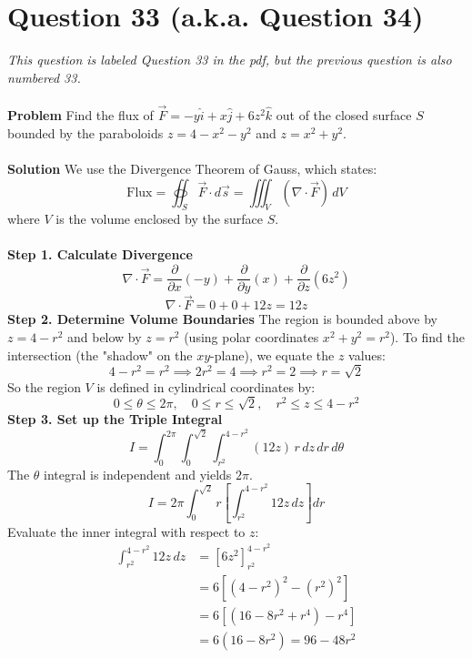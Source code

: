 \documentclass{article}
\begin{document}
\pagebreak


\section{Question 33 (a.k.a. Question 34)}
\textit{\small{This question is labeled Question 33 in the pdf, but the previous
		question is also numbered 33.}}
\\
\\
\textbf{Problem}
Find the flux of $\vec{F} = -y\hat{i} + x\hat{j} + 6z^2\hat{k}$ out of the
closed surface $S$ bounded by the paraboloids $z = 4 - x^2 - y^2$ and
$z = x^2 + y^2$.
\\
\\
\textbf{Solution}
We use the Divergence Theorem of Gauss, which states:
\[
	\text{Flux} = \oiint_S \vec{F} \cdot d\vec{s} = \iiint_V (\nabla \cdot \vec{F}) \, dV
\]
where $V$ is the volume enclosed by the surface $S$.
\\
\\
\textbf{Step 1. Calculate Divergence}
\[
	\nabla \cdot \vec{F} = \frac{\partial}{\partial x}(-y) + \frac{\partial}{\partial y}(x) + \frac{\partial}{\partial z}(6z^2)
\]
\[
	\nabla \cdot \vec{F} = 0 + 0 + 12z = 12z
\]
\textbf{Step 2. Determine Volume Boundaries}
The region is bounded above by $z = 4 - r^2$ and below by $z = r^2$ (using polar
coordinates $x^2+y^2=r^2$). To find the intersection (the "shadow" on the
$xy$-plane), we equate the $z$ values:
\[
	4 - r^2 = r^2 \implies 2r^2 = 4 \implies r^2 = 2 \implies r = \sqrt{2}
\]
So the region $V$ is defined in cylindrical coordinates by:
\[
	0 \le \theta \le 2\pi, \quad 0 \le r \le \sqrt{2}, \quad r^2 \le z \le 4 - r^2
\]
\textbf{Step 3. Set up the Triple Integral}
\[
	I = \int_0^{2\pi} \int_0^{\sqrt{2}} \int_{r^2}^{4-r^2} (12z) \, r \, dz \, dr \, d\theta
\]
The $\theta$ integral is independent and yields $2\pi$.
\[
	I = 2\pi \int_0^{\sqrt{2}} r \left[ \int_{r^2}^{4-r^2} 12z \, dz \right] dr
\]
Evaluate the inner integral with respect to $z$:
\begin{align*}
	\int_{r^2}^{4-r^2} 12z \, dz & = \left[ 6z^2 \right]_{r^2}^{4-r^2}        \\
	                             & = 6 \left[ (4-r^2)^2 - (r^2)^2 \right]     \\
	                             & = 6 \left[ (16 - 8r^2 + r^4) - r^4 \right] \\
	                             & = 6(16 - 8r^2) = 96 - 48r^2
\end{align*}
\end{document}
